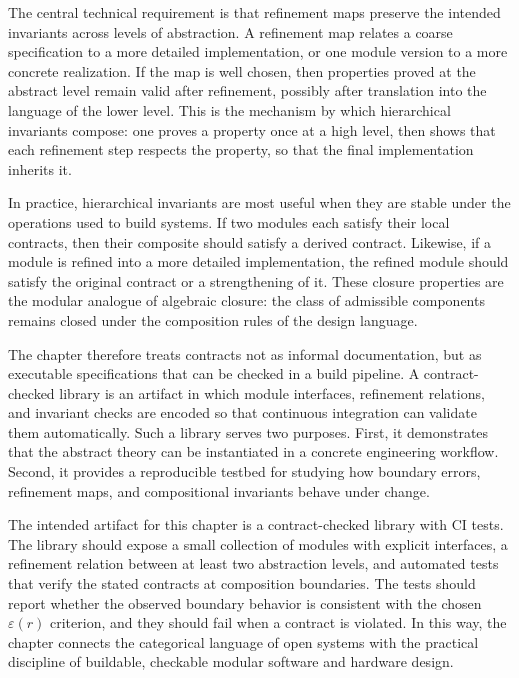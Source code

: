 \documentclass[11pt]{article}
\begin{document}
The central technical requirement is that refinement maps preserve the intended invariants across levels of abstraction. A refinement map relates a coarse specification to a more detailed implementation, or one module version to a more concrete realization. If the map is well chosen, then properties proved at the abstract level remain valid after refinement, possibly after translation into the language of the lower level. This is the mechanism by which hierarchical invariants compose: one proves a property once at a high level, then shows that each refinement step respects the property, so that the final implementation inherits it.

In practice, hierarchical invariants are most useful when they are stable under the operations used to build systems. If two modules each satisfy their local contracts, then their composite should satisfy a derived contract. Likewise, if a module is refined into a more detailed implementation, the refined module should satisfy the original contract or a strengthening of it. These closure properties are the modular analogue of algebraic closure: the class of admissible components remains closed under the composition rules of the design language.

The chapter therefore treats contracts not as informal documentation, but as executable specifications that can be checked in a build pipeline. A contract-checked library is an artifact in which module interfaces, refinement relations, and invariant checks are encoded so that continuous integration can validate them automatically. Such a library serves two purposes. First, it demonstrates that the abstract theory can be instantiated in a concrete engineering workflow. Second, it provides a reproducible testbed for studying how boundary errors, refinement maps, and compositional invariants behave under change.

The intended artifact for this chapter is a contract-checked library with CI tests. The library should expose a small collection of modules with explicit interfaces, a refinement relation between at least two abstraction levels, and automated tests that verify the stated contracts at composition boundaries. The tests should report whether the observed boundary behavior is consistent with the chosen \(\varepsilon(r)\) criterion, and they should fail when a contract is violated. In this way, the chapter connects the categorical language of open systems with the practical discipline of buildable, checkable modular software and hardware design.
\end{document}
